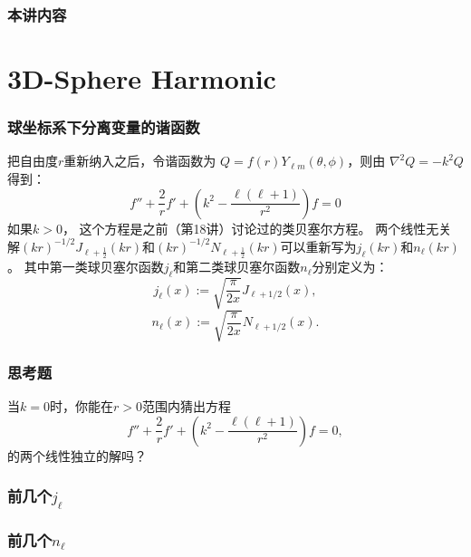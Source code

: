 \documentclass[CJK]{beamer}
\date{}
\begin{document}
\bch  
{}

\begin{frame}
\frametitle{本讲内容}

\tableofcontents
\end{frame}



\section{3D-Sphere Harmonic}


\begin{frame}
  \frametitle{球坐标系下分离变量的谐函数}
  
  把自由度$r$重新纳入之后，令谐函数为 $Q = f(r)Y_{\ell m}(\theta,\phi)$，则由 $\nabla^2Q = -k^2Q$ 得到：
  $$ f''+\frac{2}{r}f'+\left(k^2-\frac{\ell(\ell+1)}{r^2}\right) f = 0 $$
  如果$k> 0$， 这个方程是之前（第18讲）讨论过的类贝塞尔方程。
  两个线性无关解$(kr)^{-1/2}J_{\ell+\frac{1}{2}}(kr)$和$(kr)^{-1/2}N_{\ell+\frac{1}{2}}(kr)$可以重新写为$ j_\ell(kr)$和$n_{\ell}(kr)$。
  其中第一类球贝塞尔函数$j_\ell$和第二类球贝塞尔函数$n_\ell$分别定义为：{\blue
  $$ j_\ell(x) :=\sqrt{ \frac{\pi}{2x}} J_{\ell+1/2}(x), $$
  $$ n_\ell(x) :=\sqrt{ \frac{\pi}{2x}} N_{\ell+1/2}(x). $$  }
  
\end{frame}

\begin{frame}
  \frametitle{思考题}
  
  
  当$k=0$时，你能在$r>0$范围内猜出方程
  $$ f''+\frac{2}{r}f'+\left(k^2-\frac{\ell(\ell+1)}{r^2}\right) f = 0, $$
  的两个线性独立的解吗？  
\end{frame}


\begin{frame}
  \frametitle{前几个$j_\ell$}
  
  
\end{frame}


\begin{frame}
  \frametitle{前几个$n_\ell$}
  
  
\end{frame}
\end{document}
